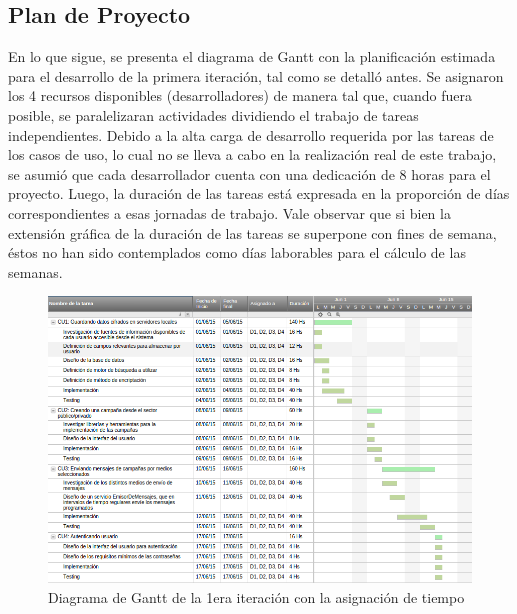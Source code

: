 \documentclass[a4paper, 10pt, twoside]{article}
\begin{document}
\subsection{Plan de Proyecto}
En lo que sigue, se presenta el diagrama de Gantt con la planificación estimada para el desarrollo de la primera iteración, tal como se detalló antes. Se asignaron los 4 recursos disponibles (desarrolladores) de manera tal que, cuando fuera posible, se paralelizaran actividades dividiendo el trabajo de tareas independientes. Debido a la alta carga de desarrollo requerida por las tareas de los casos de uso, lo cual no se lleva a cabo en la realización real de este trabajo, se asumió que cada desarrollador cuenta con una dedicación de 8 horas para el proyecto. Luego, la duración de las tareas está expresada en la proporción de días correspondientes a esas jornadas de trabajo. Vale observar que si bien la extensión gráfica de la duración de las tareas se superpone con fines de semana, éstos no han sido contemplados como días laborables para el cálculo de las semanas.

\begin{landscape}
\begin{figure}[h!]
  \centering
  \includegraphics[width=20cm]{gantt.png}
  \caption{Diagrama de Gantt de la 1era iteración con la asignación de tiempo}
  \label{fig:gantt}
\end{figure}
\end{landscape}
\newpage

\end{document}
